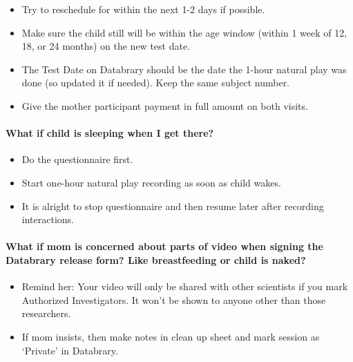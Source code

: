 \documentclass[
  12pt,
]{book}
\providecommand{\tightlist}{%
  \setlength{\itemsep}{0pt}\setlength{\parskip}{0pt}}
\begin{document}
\begin{itemize}
\tightlist
\item
  Try to reschedule for within the next 1-2 days if possible.
\item
  Make sure the child still will be within the age window (within 1 week of 12, 18, or 24 months) on the new test date.
\item
  The Test Date on Databrary should be the date the 1-hour natural play was done (so updated it if needed). Keep the same subject number.
\item
  Give the mother participant payment in full amount on both visits.
\end{itemize}

\hypertarget{what-if-child-is-sleeping-when-i-get-there}{%
\paragraph*{What if child is sleeping when I get there?}\label{what-if-child-is-sleeping-when-i-get-there}}

\begin{itemize}
\tightlist
\item
  Do the questionnaire first.
\item
  Start one-hour natural play recording as soon as child wakes.
\item
  It is alright to stop questionnaire and then resume later after recording interactions.
\end{itemize}

\hypertarget{what-if-mom-is-concerned-about-parts-of-video-when-signing-the-databrary-release-form-like-breastfeeding-or-child-is-naked}{%
\paragraph*{What if mom is concerned about parts of video when signing the Databrary release form? Like breastfeeding or child is naked?}\label{what-if-mom-is-concerned-about-parts-of-video-when-signing-the-databrary-release-form-like-breastfeeding-or-child-is-naked}}

\begin{itemize}
\tightlist
\item
  Remind her: Your video will only be shared with other scientists if you mark Authorized Investigators. It won't be shown to anyone other than those researchers.
\item
  If mom insists, then make notes in clean up sheet and mark session as `Private' in Databrary.
\end{itemize}
\end{document}
